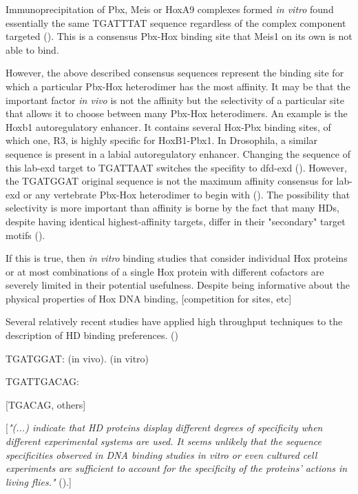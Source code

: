 Immunoprecipitation of Pbx, Meis or HoxA9 complexes formed \textit{in vitro} found essentially the same TGATTTAT sequence regardless of the complex component targeted (\cite{Shen1999}). This is a consensus Pbx-Hox binding site that Meis1 on its own is not able to bind.

However, the above described consensus sequences represent the binding site for which a particular Pbx-Hox heterodimer has the most affinity. It may be that the important factor \textit{in vivo} is not the affinity but the selectivity of a particular site that allows it to choose between many Pbx-Hox heterodimers. An example is the Hoxb1 autoregulatory enhancer. It contains several Hox-Pbx binding sites, of which one, R3, is highly specific for HoxB1-Pbx1. In Drosophila, a similar sequence is present in a labial autoregulatory enhancer. Changing the sequence of this lab-\ac{exd} target to TGATTAAT switches the specifity to dfd-\ac{exd} (\cite{Chan1997}). However, the TGATGGAT original sequence is not the maximum affinity consensus for lab-\ac{exd} or any vertebrate Pbx-Hox heterodimer to begin with (\cite{Mann1998,Shen1997}). The possibility that selectivity is more important than affinity is borne by the fact that many \acp{HD}, despite having identical highest-affinity targets, differ in their "secondary" target motifs (\cite{Berger2008}).

If this is true, then \textit{in vitro} binding studies that consider individual Hox proteins or at most combinations of a single Hox protein with different cofactors are severely limited in their potential usefulness. Despite being informative about the physical properties of Hox DNA binding, [competition for sites, etc]
		
Several relatively recent studies have applied high throughput techniques to the description of \ac{HD} binding preferences. (\cite{Slattery2011,Berger2008,Noyes2008})
		
TGATGGAT: \cite{Poepperl1995,Chan1997} (in vivo). \cite{Chang1997} (in vitro)

TGATTGACAG: \cite{Knoepfler1997}

[TGACAG, others]

[\textit{"(...) indicate that \ac{HD} proteins display different degrees of specificity when different experimental systems are used. It seems unlikely that the sequence specificities observed in DNA binding studies in vitro or even cultured cell experiments are sufficient to account for the specificity of the proteins’ actions in living flies."} (\cite{Hayashi1990}).]

